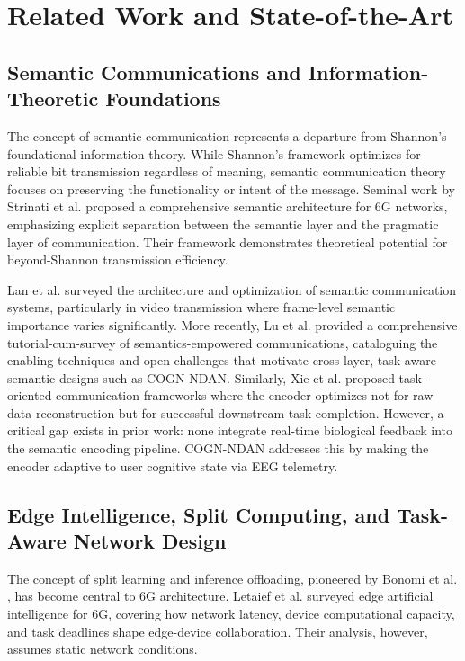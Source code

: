 \documentclass[journal]{IEEEtran}
\newcommand{\COGN}{COGN-NDAN}
\begin{document}
\section{Related Work and State-of-the-Art}

\subsection{Semantic Communications and Information-Theoretic Foundations}
The concept of semantic communication represents a departure from Shannon's foundational information theory. While Shannon's framework optimizes for reliable bit transmission regardless of meaning, semantic communication theory focuses on preserving the functionality or intent of the message. Seminal work by Strinati et al. \cite{strinati2021} proposed a comprehensive semantic architecture for 6G networks, emphasizing explicit separation between the semantic layer and the pragmatic layer of communication. Their framework demonstrates theoretical potential for beyond-Shannon transmission efficiency.

Lan et al. \cite{lan2023semantic} surveyed the architecture and optimization of semantic communication systems, particularly in video transmission where frame-level semantic importance varies significantly. More recently, Lu et al. \cite{lu2024semantics} provided a comprehensive tutorial-cum-survey of semantics-empowered communications, cataloguing the enabling techniques and open challenges that motivate cross-layer, task-aware semantic designs such as \COGN{}. Similarly, Xie et al. \cite{xie2022semantic} proposed task-oriented communication frameworks where the encoder optimizes not for raw data reconstruction but for successful downstream task completion. However, a critical gap exists in prior work: none integrate real-time biological feedback into the semantic encoding pipeline. \COGN{} addresses this by making the encoder adaptive to user cognitive state via EEG telemetry.

\subsection{Edge Intelligence, Split Computing, and Task-Aware Network Design}
The concept of split learning and inference offloading, pioneered by Bonomi et al. \cite{bonomi2012fog}, has become central to 6G architecture. Letaief et al. \cite{letaief2022edge} surveyed edge artificial intelligence for 6G, covering how network latency, device computational capacity, and task deadlines shape edge-device collaboration. Their analysis, however, assumes static network conditions.
\end{document}
